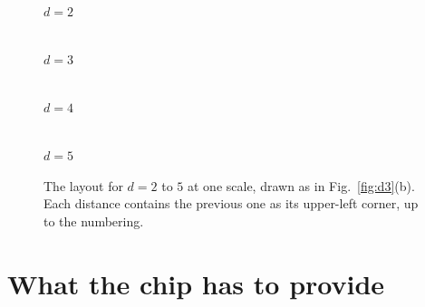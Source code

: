 \documentclass[11pt,a4paper]{article}
\begin{document}
\begin{figure}[!t]
\centering
\begin{minipage}[b]{0.17\textwidth}\centering \\[2pt] {\small $d=2$}\end{minipage}\hfill
\begin{minipage}[b]{0.30\textwidth}\centering \\[2pt] {\small $d=3$}\end{minipage}\hfill
\begin{minipage}[b]{0.44\textwidth}\centering \\[2pt] {\small $d=4$}\end{minipage}

\vspace{8pt}
\begin{minipage}[b]{0.60\textwidth}\centering \\[2pt] {\small $d=5$}\end{minipage}
\caption{The layout for $d=2$ to $5$ at one scale, drawn as in Fig.~\ref{fig:d3}(b). Each
distance contains the previous one as its upper-left corner, up to the numbering.}
\label{fig:family}
\end{figure}

\section{What the chip has to provide}
\label{sec:chip}
\end{document}
